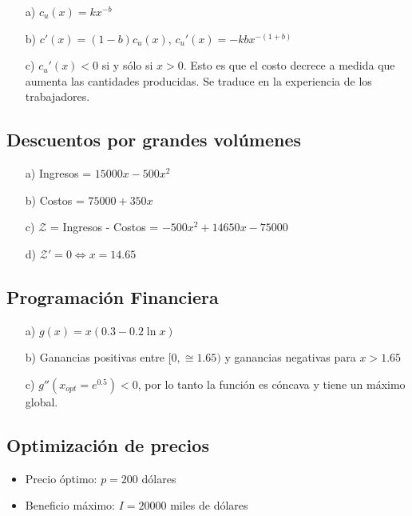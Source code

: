 \documentclass[12pt]{article}
\begin{document}
\begin{itemize}
    \item[a)] $c_u (x) = kx^{-b}$
    \item[b)] $c'(x) = (1-b) c_u(x)$, $c_u ' (x) = -kbx^{-(1+b)}$
    \item[c)] $c_u ' (x) < 0 $ si y sólo si $x>0$. Esto es que el costo decrece a medida que aumenta las cantidades producidas. Se traduce en la experiencia de los trabajadores.
\end{itemize}

\subsection{Descuentos por grandes volúmenes}

\begin{itemize}
    \item[a)] Ingresos = $15000x - 500x^2$
    \item[b)] Costos = $75000 + 350x$
    \item[c)] $\mathcal{Z}$ = Ingresos - Costos = $-500x^2 + 14650x - 75000$
    \item[d)] $\mathcal{Z}' = 0 \Longleftrightarrow x = 14.65$
\end{itemize}

\subsection{Programación Financiera}

\begin{itemize}
    \item[a)] $g(x) = x (0.3 - 0.2 \ln x)$
    \item[b)] Ganancias positivas entre $[0, \cong 1.65)$ y ganancias negativas para $ x > 1.65$
    \item[c)] $g''(x_{opt} = e^{0.5}) < 0$, por lo tanto la función es cóncava y tiene un máximo global.
\end{itemize}

\subsection{Optimización de precios}

\begin{itemize}
    \item Precio óptimo: $p = 200$ dólares
    \item Beneficio máximo: $I = 20000$ miles de dólares
\end{itemize}
\end{document}
